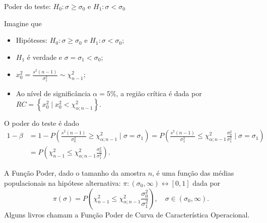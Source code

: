 \documentclass[8pt]{beamer}
\begin{document}
\begin{frame}{Poder do teste: $H_0: \sigma \geq \sigma_0$ e $H_1: \sigma < \sigma_0$}

\small

Imagine que
\begin{itemize}
	\item Hipóteses: $H_0: \sigma \geq \sigma_0$ e $H_1: \sigma < \sigma_0$;
	\item $H_1$ é verdade e $\sigma = \sigma_1 < \sigma_0$;
	\item $x_0^2 = \frac{s^2(n-1)}{\sigma_1^2} \sim \chi_{n-1}^2$;
	\item Ao nível de significância $\alpha=5\%$, a região crítica é dada por $RC=\left\{ x_0^2 \mid x_0^2 < \chi_{\alpha; n-1}^2 \right\}$.
\end{itemize}
\vfill

O poder do teste é dado
\begin{align*}
	1- \beta &= 1 - P \left( \frac{s^2(n-1)}{\sigma_0^2} \geq \chi_{\alpha;n-1}^2 \mid \sigma = \sigma_1 \right)= P \left( \frac{s^2(n-1)}{\sigma_1^2} \leq \chi_{\alpha; n-1}^2 \frac{\sigma_0^2}{\sigma_1^2} \mid \sigma = \sigma_1 \right)\\ 
	&= P \left( \chi_{n-1}^2 \leq \chi_{\alpha; n-1}^2 \frac{\sigma_0^2}{\sigma_1^2} \right).
\end{align*}

A \textcolor{important}{Função Poder}, dado o tamanho da amostra $n$, é uma função das médias populacionais na hipótese alternativa: $\pi: (\sigma_0, \infty) \longleftrightarrow [0,1]$ dada por
$$\pi(\sigma) = P \left( \chi_{n-1}^2 \leq \chi_{\alpha; n-1}^2 \frac{\sigma_0^2}{\sigma_1^2} \right), \quad \sigma \in (\sigma_0, \infty).$$
Alguns livros chamam a Função Poder de  \textcolor{important}{Curva de Característica Operacional.}

\normalsize

\end{frame}
\end{document}
